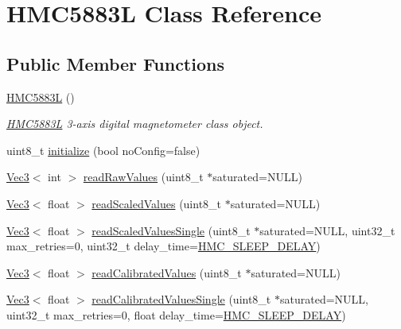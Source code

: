 \hypertarget{class_h_m_c5883_l}{\section{H\+M\+C5883\+L Class Reference}
\label{class_h_m_c5883_l}
}
\subsection*{Public Member Functions}
\begin{DoxyCompactItemize}
\item 
\hyperlink{class_h_m_c5883_l_ab552ed5dd985c500aa37ac11f9ed3eed}{H\+M\+C5883\+L} ()
\begin{DoxyCompactList}\small\item\em \hyperlink{class_h_m_c5883_l}{H\+M\+C5883\+L} 3-\/axis digital magnetometer class object. \end{DoxyCompactList}\item 
uint8\+\_\+t \hyperlink{class_h_m_c5883_l_adce69beed189b56b294775e273768b87}{initialize} (bool no\+Config=false)
\item 
\hyperlink{struct_vec3}{Vec3}$<$ int $>$ \hyperlink{class_h_m_c5883_l_aef71c4ee9d0a549cb86f6bb90bb238b2}{read\+Raw\+Values} (uint8\+\_\+t $\ast$saturated=N\+U\+L\+L)
\item 
\hyperlink{struct_vec3}{Vec3}$<$ float $>$ \hyperlink{class_h_m_c5883_l_ac270d4672e1e0ed759ee07a504f2ab00}{read\+Scaled\+Values} (uint8\+\_\+t $\ast$saturated=N\+U\+L\+L)
\item 
\hyperlink{struct_vec3}{Vec3}$<$ float $>$ \hyperlink{class_h_m_c5883_l_a16828549ee509bb4fa8a3995424c8889}{read\+Scaled\+Values\+Single} (uint8\+\_\+t $\ast$saturated=N\+U\+L\+L, uint32\+\_\+t max\+\_\+retries=0, uint32\+\_\+t delay\+\_\+time=\hyperlink{group___general_constants_ga26afbcf737f1add055ea8929c03648a9}{H\+M\+C\+\_\+\+S\+L\+E\+E\+P\+\_\+\+D\+E\+L\+A\+Y})
\item 
\hyperlink{struct_vec3}{Vec3}$<$ float $>$ \hyperlink{class_h_m_c5883_l_a6cc926cb263a856f4f3f77092d550139}{read\+Calibrated\+Values} (uint8\+\_\+t $\ast$saturated=N\+U\+L\+L)
\item 
\hyperlink{struct_vec3}{Vec3}$<$ float $>$ \hyperlink{class_h_m_c5883_l_acfb30a00675cd4a71809b103b06edfaa}{read\+Calibrated\+Values\+Single} (uint8\+\_\+t $\ast$saturated=N\+U\+L\+L, uint32\+\_\+t max\+\_\+retries=0, float delay\+\_\+time=\hyperlink{group___general_constants_ga26afbcf737f1add055ea8929c03648a9}{H\+M\+C\+\_\+\+S\+L\+E\+E\+P\+\_\+\+D\+E\+L\+A\+Y})

\end{DoxyCompactItemize}
